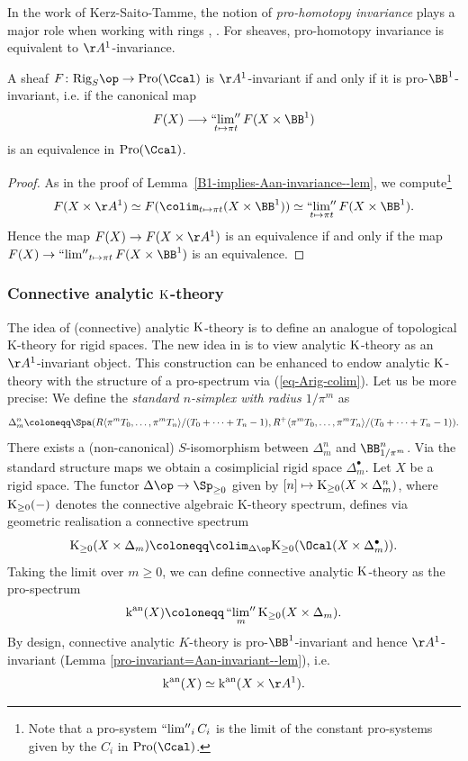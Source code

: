\documentclass[colorinlistoftodos,article,11pt,reqno]{article}
\newcommand{\Rig}{\textup{Rig}}
\newcommand{\Pro}{\textup{Pro}}
\newcommand{\K}{\textup{K}}
\newcommand{\kan}{\textup{k}^\textup{an}}
\newcommand{\Arig}{\AA^{1}}
\newcommand{\Brig}{\BB^{1}}
\renewcommand{\to}[1][]{\overset{#1}{\rightarrow}}
\newcommand{\To}[1][]{\overset{#1}{\longrightarrow}}
\DeclareMathOperator*{\prolim}{``lim''}
\begin{document}
In the work of Kerz-Saito-Tamme, the notion of \emph{pro-homotopy invariance} plays a major role when working with rings \cite{kst-bass-quillen}, \cite[\S 5.3]{kst-i}. For sheaves, pro-homotopy invariance is equivalent to $\Arig$-invariance.

\begin{lemma} \label{pro-invariant=Aan-invariant--lem}
A sheaf $F \colon \Rig_S\op \to \Pro(\Ccal)$ is $\Arig$-invariant if and only if it is pro-$\Brig$-invariant, i.e. if the canonical map 
    \[
	F(X) \To \prolim_{t\mapsto\pi t} F(X\times\Brig)
	\]
is an equivalence in $\Pro(\Ccal)$.
\end{lemma}
\begin{proof}
As in the proof of Lemma~\ref{B1-implies-Aan-invariance--lem}, we compute\footnote{Note that a pro-system $\prolim_iC_i$ is the limit of the constant pro-systems given by the $C_i$ in $\Pro(\Ccal)$.}
	\begin{align*}
	F(X\times\Arig) 
	\simeq F(\colim_{t\mapsto\pi t}(X\times\Brig)) 
	\simeq \prolim_{t\mapsto\pi t} F(X\times\Brig).
	\end{align*}
Hence the map $F(X) \to F(X\times\Arig)$ is an equivalence if and only if the map $F(X) \to \prolim_{t\mapsto\pi t} F(X\times\Brig)$ is an equivalence.
\end{proof}



\subsubsection*{Connective analytic $\K$-theory}
The idea of (connective) analytic $\K$-theory is to define an analogue of topological K-theory for rigid spaces. The new idea in \cite{kst-i} is to view analytic $\K$-theory as an $\Arig$-invariant object. This construction can be enhanced to endow analytic $\K$-theory with the structure of a pro-spectrum via (\ref{eq-Arig-colim}). Let us be more precise:
We define the \textit{standard $n$-simplex with radius $1/\pi^{m}$} as
$$
    \Delta^{n}_{m} \coloneqq \Spa(R\langle \pi^{m}T_{0},\dots, \pi^{m}T_{n}\rangle/(T_0+\dots + T_n -1), R^+\langle \pi^{m}T_{0},\dots, \pi^{m}T_{n}\rangle/(T_0+\dots + T_n -1)).
$$
There exists a (non-canonical) $S$-isomorphism between $\Delta^{n}_{m}$ and $\BB^{n}_{1/\pi^m}$.
Via the standard structure maps we obtain a cosimplicial rigid space $\Delta^\bullet_m$.
Let $X$ be a rigid space. The functor $\Delta\op\to \Sp_{\geq 0}$ given by $[n]\mapsto \textup{K}_{\geq 0}(X\times \Delta^{n}_{m})$, where $\textup{K}_{\geq 0}(-)$ denotes the connective algebraic K-theory spectrum,  defines via geometric realisation a connective spectrum 
$$
    \K_{\geq 0}(X\times \Delta_{m})\coloneqq \colim_{\Delta\op} \K_{\geq 0}(\Ocal(X\times \Delta^{\bullet}_{m})).
$$
Taking the limit over $m\geq 0$, we can define connective analytic $\K$-theory as the pro-spectrum
$$
    \kan(X)\coloneqq \prolim_{m} \K_{\geq 0} (X\times \Delta_{m}).
$$
By design, connective analytic $K$-theory is pro-$\Brig$-invariant \cite[Prop. 6.3]{kst-i} and hence $\Arig$-invariant (Lemma \ref{pro-invariant=Aan-invariant--lem}), i.e. 
$$ \kan(X)\simeq  \kan(X\times \Arig). $$
\end{document}
